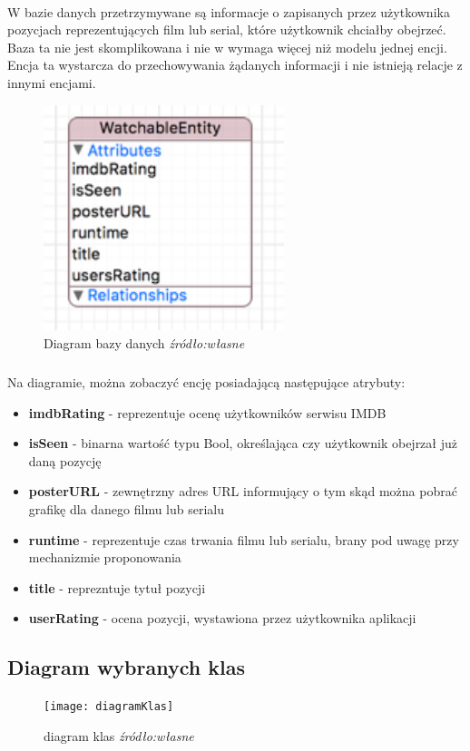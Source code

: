 \documentclass[12pt,oneside,a4paper]{report}
\begin{document}
\paragraph{}W bazie danych przetrzymywane są informacje o zapisanych przez użytkownika pozycjach reprezentujących film lub serial, które użytkownik chciałby obejrzeć. Baza ta nie jest skomplikowana i nie w wymaga więcej niż modelu jednej encji. Encja ta wystarcza do przechowywania żądanych informacji i nie istnieją relacje z innymi encjami.
\begin{figure}[ht!]
	\centering
	\includegraphics[width=7cm]{watchableEntity}
	\caption{Diagram bazy danych 
		\textit{źródło:własne }}
	\label{watchableEntity}
\end{figure}
\subparagraph{}Na diagramie, można zobaczyć encję posiadającą następujące atrybuty:
\begin{itemize}
	\item \textbf{imdbRating} - reprezentuje ocenę użytkowników serwisu IMDB
	\item \textbf{isSeen} - binarna wartość typu Bool, określająca czy użytkownik obejrzał już daną pozycję  
	\item \textbf{posterURL} - zewnętrzny adres URL informujący o tym skąd można pobrać grafikę dla danego filmu lub serialu
	\item \textbf{runtime} - reprezentuje czas trwania filmu lub serialu, brany pod uwagę przy mechanizmie proponowania
	\item \textbf{title} - reprezntuje tytuł pozycji
	\item \textbf{userRating} - ocena pozycji, wystawiona przez użytkownika aplikacji 
\end{itemize}
\subsection{Diagram wybranych klas}
	\begin{figure}[ht!]
	\centering
	\texttt{[image: diagramKlas]}
	\caption{diagram klas
		\textit{źródło:własne}}
	\label{diagramKlas}
\end{figure}
\end{document}

